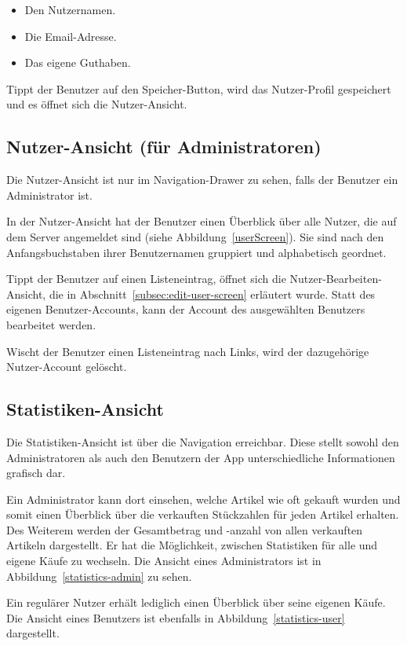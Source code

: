 \begin{itemize}
	\item Den Nutzernamen.
	\item Die Email-Adresse.
	\item Das eigene Guthaben.
\end{itemize}

Tippt der Benutzer auf den Speicher-Button, wird das Nutzer-Profil gespeichert und es öffnet sich die Nutzer-Ansicht.

\subsection{Nutzer-Ansicht (für Administratoren)} \label{subsec:user-screen}

Die Nutzer-Ansicht ist nur im Navigation-Drawer zu sehen, falls der Benutzer ein Administrator ist.

In der Nutzer-Ansicht hat der Benutzer einen Überblick über alle Nutzer, die auf dem Server angemeldet sind (siehe Abbildung~\ref{userScreen}).
Sie sind nach den Anfangsbuchstaben ihrer Benutzernamen gruppiert und alphabetisch geordnet.

Tippt der Benutzer auf einen Listeneintrag, öffnet sich die Nutzer-Bearbeiten-Ansicht, die in Abschnitt~\ref{subsec:edit-user-screen} erläutert wurde.
Statt des eigenen Benutzer-Accounts, kann der Account des ausgewählten Benutzers bearbeitet werden.

Wischt der Benutzer einen Listeneintrag nach Links, wird der dazugehörige Nutzer-Account gelöscht.

\subsection{Statistiken-Ansicht} \label{subsec:statistics-screen}

Die Statistiken-Ansicht ist über die Navigation erreichbar.
Diese stellt sowohl den Administratoren als auch den Benutzern der App unterschiedliche Informationen grafisch dar.

Ein Administrator kann dort einsehen, welche Artikel wie oft gekauft wurden und somit einen Überblick über die verkauften Stückzahlen für jeden Artikel erhalten.
Des Weiterem werden der Gesamtbetrag und -anzahl von allen verkauften Artikeln dargestellt.
Er hat die Möglichkeit, zwischen Statistiken für alle und eigene Käufe zu wechseln.
Die Ansicht eines Administrators ist in Abbildung~\ref{statistics-admin} zu sehen.

Ein regulärer Nutzer erhält lediglich einen Überblick über seine eigenen Käufe.
Die Ansicht eines Benutzers ist ebenfalls in Abbildung~\ref{statistics-user} dargestellt.

